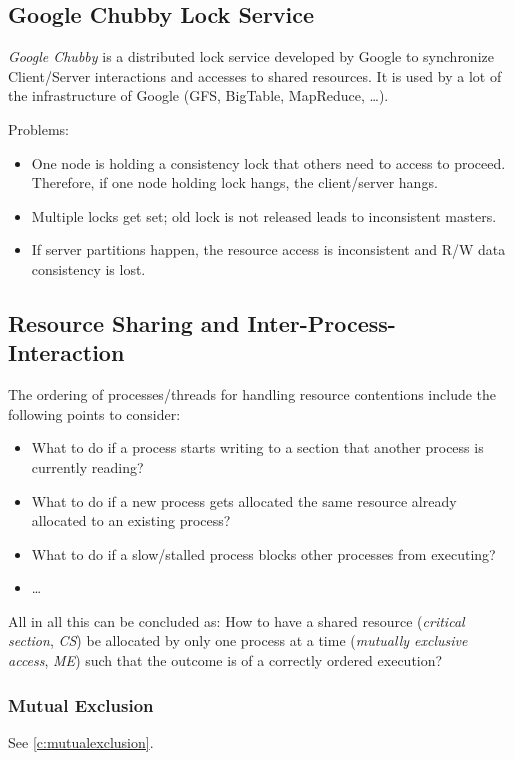 \documentclass[a4paper, 11pt, accentcolor = tud3b]{tudreport}
\begin{document}
            \subsection{Google Chubby Lock Service}
                \textit{Google Chubby} is a distributed lock service developed by Google to synchronize Client/Server interactions and accesses to shared resources. It is used by a lot of the infrastructure of Google (GFS, BigTable, MapReduce, \dots).
                
                Problems:
                \begin{itemize}
                	\item One node is holding a consistency lock that others need to access to proceed. Therefore, if one node holding lock hangs, the client/server hangs.
                	\item Multiple locks get set; old lock is not released leads to inconsistent masters.
                	\item If server partitions happen, the resource access is inconsistent and R/W data consistency is lost.
                \end{itemize}

            \subsection{Resource Sharing and Inter-Process-Interaction}
	            The ordering of processes/threads for handling resource contentions include the following points to consider:
	            \begin{itemize}
	            	\item What to do if a process starts writing to a section that another process is currently reading?
	            	\item What to do if a new process gets allocated the same resource already allocated to an existing process?
	            	\item What to do if a slow/stalled process blocks other processes from executing?
	            	\item \dots
	            \end{itemize}
	            All in all this can be concluded as: How to have a shared resource (\textit{critical section}, \textit{CS}) be allocated by only one process at a time (\textit{mutually exclusive access}, \textit{ME}) such that the outcome is of a correctly ordered execution?
            
                \subsubsection{Mutual Exclusion}
	                See \ref{c:mutualexclusion}.
\end{document}
